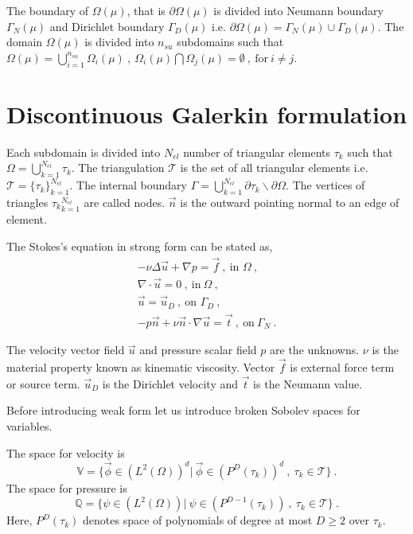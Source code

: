 \documentclass[graybox]{svmult}
\begin{document}
The boundary of $\Omega(\mu)$, that is $\partial \Omega(\mu)$ is divided into Neumann boundary $\Gamma_N(\mu)$ and Dirichlet boundary $\Gamma_D(\mu)$ i.e. $\partial \Omega(\mu) = \Gamma_N(\mu) \cup \Gamma_D(\mu)$. The domain $\Omega(\mu)$ is divided into $n_{su}$ subdomains such that $\Omega(\mu) = \bigcup\limits_{i=1}^{n_{su}} \Omega_i(\mu) \ , \ \Omega_i(\mu) \bigcap \Omega_j(\mu) = \emptyset \ , \ \text{for} \ i \neq j$. 

\section{Discontinuous Galerkin formulation}
\label{DG_formulation}

Each subdomain is divided into $N_{el}$ number of triangular elements $\tau_k$ such that $\Omega = \bigcup\limits_{k=1}^{N_{el}} \tau_k$. The triangulation $\mathcal{T}$ is the set of all triangular elements i.e. $\mathcal{T} = \lbrace \tau_k \rbrace_{k=1}^{N_{el}}$. The internal boundary $\Gamma = \bigcup\limits_{k=1}^{N_{el}} \partial \tau_k \backslash \partial \Omega$. The vertices of triangles ${\tau_k}_{k=1}^{N_{el}}$ are called nodes. $\overrightarrow{n}$ is the outward pointing normal to an edge of element.

The Stokes's equation in strong form can be stated as,
\begin{gather}\label{stokes_strong_form}
-\nu \Delta \overrightarrow{u} + \nabla p = \overrightarrow{f} \ , \ \text{in } \Omega \ , \\
\nabla \cdot \overrightarrow{u} = 0 \ , \ \text{in} \ \Omega \ , \\
\overrightarrow{u} = \overrightarrow{u}_D \ , \ \text{on } \Gamma_D \ , \\
-p \overrightarrow{n} + \nu \overrightarrow{n} \cdot \nabla \overrightarrow{u} = \overrightarrow{t} \ , \ \text{on} \ \Gamma_N \ .
\end{gather}

The velocity vector field $\overrightarrow{u}$ and pressure scalar field $p$ are the unknowns. $\nu$ is the material property known as kinematic viscosity. Vector $\overrightarrow{f}$ is external force term or source term. $\overrightarrow{u}_D$ is the Dirichlet velocity and $\overrightarrow{t}$ is the Neumann value.

Before introducing weak form let us introduce broken Sobolev spaces for variables.

The space for velocity is 
\begin{equation} \label{velocity_test}
\mathbb{V} = \lbrace \overrightarrow{\phi} \in (L^2(\Omega))^d | \ \overrightarrow{\phi} \in (P^D(\tau_k))^d \ , \ \tau_k \in \mathcal{T} \rbrace \ .
\end{equation}
The space for pressure is 
\begin{equation} \label{pressure_test}
\mathbb{Q} = \lbrace \psi \in (L^2(\Omega)) | \ \psi \in (P^{D-1}(\tau_k)) \ , \ \tau_k \in \mathcal{T} \rbrace \ .
\end{equation}
Here, $P^D(\tau_k)$ denotes space of polynomials of degree at most $D \geq 2$ over $\tau_k$.
\end{document}
